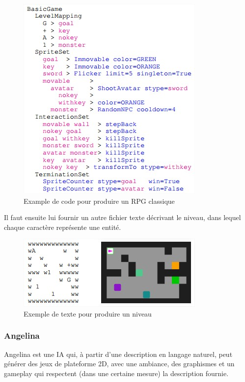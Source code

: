 \documentclass[a4paper, 12pt]{article} %
\begin{document}
\begin{figure}[!h]%
	\begin{center} 
		\includegraphics[width=0.60\columnwidth]{images/vgdlgame.jpg}%
		\caption{Example de code pour produire un RPG classique}%
	\end{center}
\end{figure}

\newpage
Il faut ensuite lui fournir un autre fichier texte décrivant le niveau, dans lequel chaque caractère représente une entité.

\begin{figure}[!h]%
	\begin{center} 
		\includegraphics[width=0.60\columnwidth]{images/vgdllevel.jpg}%
		\caption{Exemple de texte pour produire un niveau}%
	\end{center}
\end{figure}



\newpage
\subsubsection{Angelina}

Angelina est une IA qui, à partir d’une description en langage naturel, peut générer des jeux de plateforme 2D, avec une ambiance, des graphismes et un gameplay qui respectent (dans une certaine mesure) la description fournie.
\end{document}
